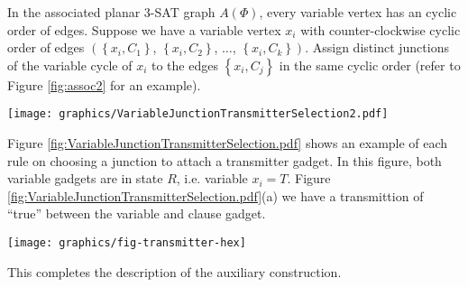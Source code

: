 \documentclass[10pt]{CSUNthesis}
\theoremstyle{plain}%
\theoremstyle{definition}
\theoremstyle{remark}
\begin{document}
In the associated planar 3-SAT graph $A(\Phi)$, every variable vertex has an cyclic order of edges.
Suppose we have a variable vertex $x_i$ with counter-clockwise cyclic order of edges $\left(\left\lbrace x_i,C_1\right\rbrace\right.$, $\left\lbrace x_i,C_2\right\rbrace$, $\dots$, $\left.\left\lbrace x_i,C_k\right\rbrace\right) $.  
Assign distinct junctions of the variable cycle of $x_i$ to the edges $\left\lbrace x_i,C_j\right\rbrace$ in the same cyclic order (refer to Figure \ref{fig:assoc2} for an example).

\begin{minipage}{\linewidth}
\begin{center}
\texttt{[image: graphics/VariableJunctionTransmitterSelection2.pdf]}
\label{fig:VariableJunctionTransmitterSelection.pdf}
\end{center}
\end{minipage} 

Figure \ref{fig:VariableJunctionTransmitterSelection.pdf} shows an example of each rule on choosing a junction to attach a transmitter gadget.
In this figure, both variable gadgets are in state $R$, i.e. variable $x_i = T$.  
Figure \ref{fig:VariableJunctionTransmitterSelection.pdf}(a) we have a transmittion of ``true'' between the variable and clause gadget.

\begin{minipage}{\linewidth}
\begin{center}
	\texttt{[image: graphics/fig-transmitter-hex]}
	\label{fig:transmitter}
\end{center}
\end{minipage} 

This completes the description of the auxiliary construction.
\end{document}
